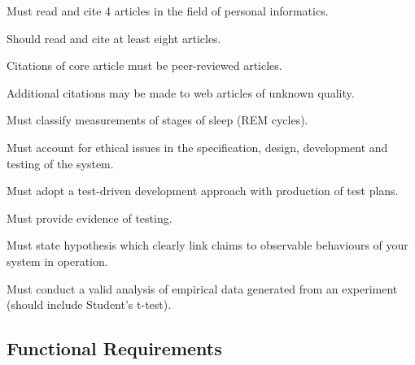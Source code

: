 \begin{reqtable}

  \reqheader

  {Must read and cite 4 articles in the field of personal informatics.}
  \phigh
  \dnone
  \sspec

  {Should read and cite at least eight articles.}
  \pmed
  \dnone
  \sspec

  {Citations of core article must be peer-reviewed articles.}
  \phigh
  \deps{\ref{req:4-articles}}
  \sspec

  {Additional citations may be made to web articles of unknown quality.}
  \plow
  \dnone
  \sspec

  {Must classify measurements of stages of sleep (REM cycles).}
  \phigh
  \dnone


  \reqheader

  {Must account for ethical issues in the specification, design, development and testing of the
    system.}
  \phigh
  \dnone
  \sspec


  \reqheader

  {Must adopt a test-driven development approach with production of test plans.}
  \phigh
  \dnone
  \sspec

  {Must provide evidence of testing.}
  \phigh
  \dnone
  \sspec

  {Must state hypothesis which clearly link claims to observable behaviours of your system in
    operation.}
  \phigh
  \dnone
  \sspec

  {Must conduct a valid analysis of empirical data generated from an experiment (should include
    Student's t-test).}
  \phigh
  \dnone
  \sspec
\end{reqtable}

\subsection{Functional Requirements}\label{ssec:functional-requirements}

